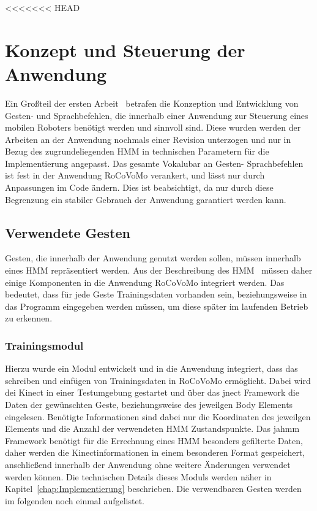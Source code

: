 <<<<<<< HEAD
\chapter{Konzept und Steuerung der Anwendung}
\label{chap:Konzept}

Ein Gro\ss teil der ersten Arbeit~\cite{bib:Ebner_Werling} betrafen die Konzeption und Entwicklung von Gesten- und Sprachbefehlen, die innerhalb einer Anwendung zur Steuerung eines mobilen Roboters ben\"otigt werden und sinnvoll sind. Diese wurden werden der Arbeiten an der Anwendung nochmals einer Revision unterzogen und nur in Bezug des zugrundeliegenden \gls{HMM} in technischen Parametern f\"ur die Implementierung angepasst.
\newline
Das gesamte Vokalubar an Gesten- Sprachbefehlen ist fest in der Anwendung RoCoVoMo verankert, und l\"asst nur durch Anpassungen im Code \"andern. Dies ist beabsichtigt, da nur durch diese Begrenzung ein stabiler Gebrauch der Anwendung garantiert werden kann.

\section{Verwendete Gesten}
Gesten, die innerhalb der Anwendung genutzt werden sollen, m\"ussen innerhalb eines \gls{HMM} repr\"asentiert werden. Aus der Beschreibung des \gls{HMM}~\cite{bib:Ebner_Werling} m\"ussen daher einige Komponenten in die Anwendung RoCoVoMo integriert werden. Das bedeutet, dass f\"ur jede Geste Trainingsdaten vorhanden sein, beziehungsweise in das Programm eingegeben werden m\"ussen, um diese sp\"ater im laufenden Betrieb zu erkennen.

\subsection{Trainingsmodul}
Hierzu wurde ein Modul entwickelt und in die Anwendung integriert, dass das schreiben und einf\"ugen von Trainingsdaten in RoCoVoMo erm\"oglicht. Dabei wird dei Kinect in einer Testumgebung gestartet und \"uber das jnect Framework die Daten der gew\"unschten Geste, beziehungsweise des jeweilgen Body Elements eingelesen. Ben\"otigte Informationen sind dabei nur die Koordinaten des jeweilgen Elements und die Anzahl der verwendeten HMM Zustandspunkte. Das jahmm Framework ben\"otigt f\"ur die Errechnung eines \gls{HMM} besonders gefilterte Daten, daher werden die Kinectinformationen in einem besonderen Format gespeichert, anschlie\ss end innerhalb der Anwendung ohne weitere \"Anderungen verwendet werden k\"onnen. Die technischen Details dieses Moduls werden n\"aher in Kapitel~\ref{chap:Implementierung} beschrieben.
\newline
Die verwendbaren Gesten werden im folgenden noch einmal aufgelistet.

